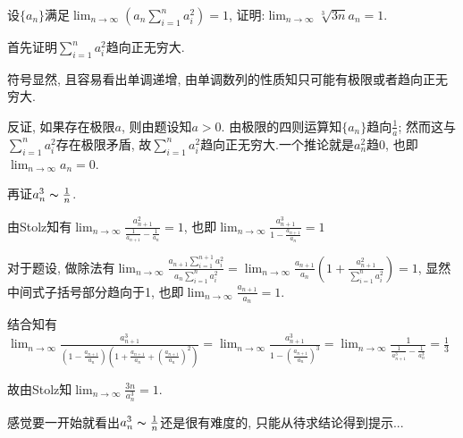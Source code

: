      \begin{exercise}
         设$\{a_n\}$满足$\lim_{n\to\infty}(a_n \sum_{i=1}^{n}a_i^2)=1$, 证明:$\lim_{n\to\infty}\sqrt[3]{3n}a_n=1$.
     \end{exercise}
     \begin{solution}

         首先证明$\sum_{i=1}^{n}a_i^2$趋向正无穷大.

         符号显然, 且容易看出单调递增, 由单调数列的性质知只可能有极限或者趋向正无穷大.

         反证, 如果存在极限$a$, 则由题设知$a>0$. 由极限的四则运算知$\{a_n\}$趋向$\frac{1}{a}$; 然而这与$\sum_{i=1}^{n}a_i^2$存在极限矛盾, 故$\sum_{i=1}^{n}a_i^2$趋向正无穷大.一个推论就是$a_n^2$趋0, 也即$\lim_{n\to\infty} a_n=0$.

         再证$a_n^3\thicksim \frac{1}{n}$.

         由Stolz知有$\lim_{n\to\infty}\frac{a_{n+1}^2}{\frac{1}{a_{n+1}}-\frac{1}{a_n}}=1$, 也即$\lim_{n\to\infty}\frac{a_{n+1}^3}{1-\frac{a_{n+1}}{a_n}}=1$

         对于题设, 做除法有$\lim_{n\to\infty}\frac{a_{n+1}\sum_{i=1}^{n+1}a_i^2}{a_n \sum_{i=1}^{n}a_i^2}=\lim_{n\to\infty}\frac{a_{n+1}}{a_n}(1+\frac{a_{n+1}^2}{\sum_{i=1}^{n}a_i^2})=1$, 显然中间式子括号部分趋向于1, 也即$\lim_{n\to\infty}\frac{a_{n+1}}{a_n}=1$.

         结合知有$\lim_{n\to\infty}\frac{a_{n+1}^3}{(1-\frac{a_{n+1}}{a_n})(1+\frac{a_{n+1}}{a_n}+(\frac{a_{n+1}}{a_n})^2)}=\lim_{n\to\infty}\frac{a_{n+1}^3}{1-(\frac{a_{n+1}}{a_n})^3}=\lim_{n\to\infty}\frac{1}{\frac{1}{a_{n+1}^3}-\frac{1}{a_n^3}}=\frac{1}{3}$

         故由Stolz知$\lim_{n\to\infty}\frac{3n}{a_n^3}=1$.
     \end{solution}
     \begin{note}
         感觉要一开始就看出$a_n^3\thicksim \frac{1}{n}$还是很有难度的, 只能从待求结论得到提示...
     \end{note}

